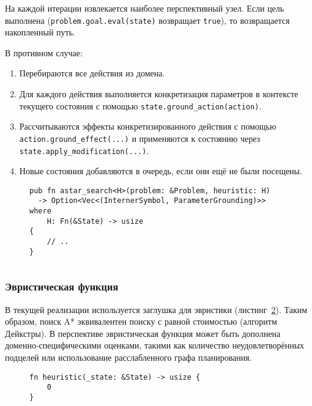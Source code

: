 \documentclass{article}
\begin{document}
На каждой итерации извлекается наиболее перспективный узел. Если цель выполнена (\texttt{problem.goal.eval(state)} возвращает \texttt{true}), то возвращается накопленный путь.

В противном случае:
\begin{enumerate}
    \item Перебираются все действия из домена.
    \item Для каждого действия выполняется конкретизация параметров в контексте текущего состояния с помощью \texttt{state.ground\_action(action)}.
    \item Рассчитываются эффекты конкретизированного действия с помощью \\
      \texttt{action.ground\_effect(...)} и применяются к состоянию через \\
      \texttt{state.apply\_modification(...)}.
    \item Новые состояния добавляются в очередь, если они ещё не были посещены.
\end{enumerate}

\begin{figure}
  \begin{verbatim}
pub fn astar_search<H>(problem: &Problem, heuristic: H)
  -> Option<Vec<(InternerSymbol, ParameterGrounding)>> 
where
    H: Fn(&State) -> usize
{
    // ..
}
  \end{verbatim}
  \label{code:search}
\end{figure}

\begin{verbatim}
\end{verbatim}

\subsubsection{Эвристическая функция}

В текущей реализации используется заглушка для эвристики (листинг~\ref{code:heuristic}).
Таким образом, поиск A* эквивалентен поиску с равной стоимостью (алгоритм Дейкстры).
В перспективе эвристическая функция может быть дополнена доменно-специфическими оценками,
такими как количество неудовлетворённых подцелей или использование расслабленного графа планирования.

\begin{figure}
  \begin{verbatim}
fn heuristic(_state: &State) -> usize {
    0
}
  \end{verbatim}
  \label{code:heuristic}
\end{figure}
\end{document}
